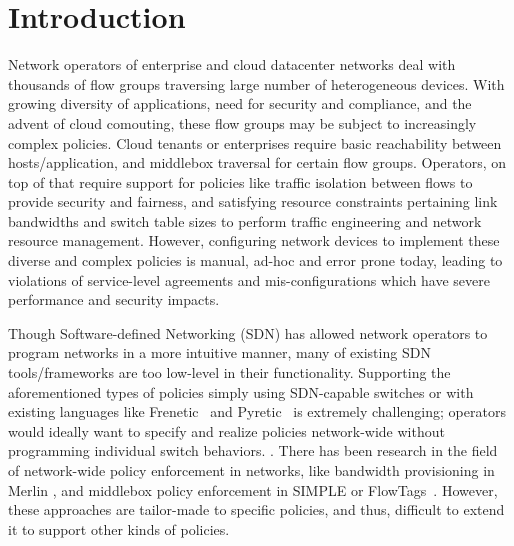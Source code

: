 \section{Introduction}

Network operators of enterprise and cloud datacenter networks deal
with thousands of flow groups traversing large number of heterogeneous
devices. With growing diversity of applications, need for security and
compliance, and the advent of cloud comouting, these flow groups may
be subject to increasingly complex policies. Cloud tenants or
enterprises require basic reachability between hosts/application, and
middlebox traversal for certain flow groups. Operators, on top of that
require support for policies like traffic isolation between flows to
provide security and fairness, and satisfying resource constraints
pertaining link bandwidths and switch table sizes to perform traffic
engineering and network resource management.  However, configuring
network devices to implement these diverse and complex policies is
manual, ad-hoc and error prone today, leading to violations of
service-level agreements and mis-configurations which have severe
performance and security impacts.



Though Software-defined Networking (SDN) has allowed network operators
to program networks in a more intuitive manner, many of existing SDN
tools/frameworks are too low-level in their functionality. Supporting
the aforementioned types of policies simply using SDN-capable switches
or with existing languages like Frenetic~\cite{frenetic} and
Pyretic~\cite{pyretic} is extremely challenging; operators would
ideally want to specify and realize policies network-wide without
programming individual switch behaviors. .
There has been research in the field of network-wide policy
enforcement in networks, like bandwidth provisioning in Merlin
\cite{Merlin}, and middlebox policy enforcement in SIMPLE
\cite{simple} or FlowTags~\cite{flowtags}. However, these approaches
are tailor-made to specific policies, and thus, difficult to extend it
to support other kinds of policies.

